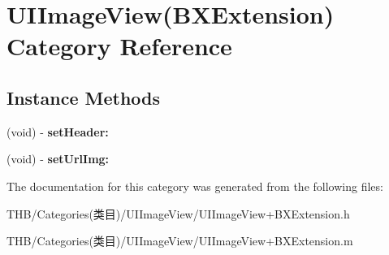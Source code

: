 \hypertarget{category_u_i_image_view_07_b_x_extension_08}{}\section{U\+I\+Image\+View(B\+X\+Extension) Category Reference}
\label{category_u_i_image_view_07_b_x_extension_08}
\subsection*{Instance Methods}
\begin{DoxyCompactItemize}
\item 
\mbox{\label{category_u_i_image_view_07_b_x_extension_08_a0a3d830c921cf691200a6f679379e74a}} 
(void) -\/ {\bfseries set\+Header\+:}
\item 
\mbox{\label{category_u_i_image_view_07_b_x_extension_08_a7df80e6f7e03354a31e02d51edc5618f}} 
(void) -\/ {\bfseries set\+Url\+Img\+:}
\end{DoxyCompactItemize}


The documentation for this category was generated from the following files\+:\begin{DoxyCompactItemize}
\item 
T\+H\+B/\+Categories(类目)/\+U\+I\+Image\+View/U\+I\+Image\+View+\+B\+X\+Extension.\+h\item 
T\+H\+B/\+Categories(类目)/\+U\+I\+Image\+View/U\+I\+Image\+View+\+B\+X\+Extension.\+m\end{DoxyCompactItemize}
